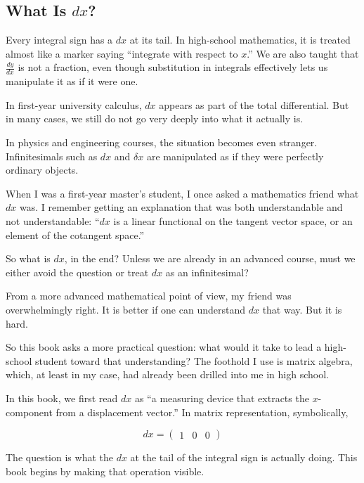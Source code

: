 \documentclass[a4paper,12pt,openany]{book}
\begin{document}
\hypertarget{what-is-dx}{%
\subsection{\texorpdfstring{What Is
\(dx\)?}{What Is dx?}}\label{what-is-dx}}

Every integral sign has a \(dx\) at its tail. In high-school
mathematics, it is treated almost like a marker saying ``integrate with
respect to \(x\).'' We are also taught that \(\frac{dy}{dx}\) is not a
fraction, even though substitution in integrals effectively lets us
manipulate it as if it were one.

In first-year university calculus, \(dx\) appears as part of the total
differential. But in many cases, we still do not go very deeply into
what it actually is.

In physics and engineering courses, the situation becomes even stranger.
Infinitesimals such as \(dx\) and \(\delta x\) are manipulated as if
they were perfectly ordinary objects.

When I was a first-year master's student, I once asked a mathematics
friend what \(dx\) was. I remember getting an explanation that was both
understandable and not understandable: ``\(dx\) is a linear functional
on the tangent vector space, or an element of the cotangent space.''

So what is \(dx\), in the end? Unless we are already in an advanced
course, must we either avoid the question or treat \(dx\) as an
infinitesimal?

From a more advanced mathematical point of view, my friend was
overwhelmingly right. It is better if one can understand \(dx\) that
way. But it is hard.

So this book asks a more practical question: what would it take to lead
a high-school student toward that understanding? The foothold I use is
matrix algebra, which, at least in my case, had already been drilled
into me in high school.

In this book, we first read \(dx\) as ``a measuring device that extracts
the \(x\)-component from a displacement vector.'' In matrix
representation, symbolically,

\[
dx=\begin{pmatrix}1&0&0\end{pmatrix}
\]

The question is what the \(dx\) at the tail of the integral sign is
actually doing. This book begins by making that operation visible.
\end{document}
